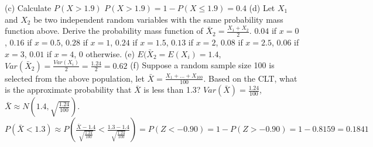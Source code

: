 \documentclass[9pt]{article}
\newcommand*\mean[1]{\bar{#1}}
\begin{document}
\begin{multicols*}{2}
    (c) Calculate $P(X>1.9)$
    $P(X>1.9) = 1-P(X\leq 1.9) = 0.4$\newline
    (d) Let $X_1$ and $X_2$ be two independent random variables with the same probability mass function above. Derive the probability mass function of $\mean{X}_2=\frac{X_1+X_2}{2}$.
    $0.04$ if $x=0$, $0.16$ if $x=0.5$, $0.28$ if $x=1$, $0.24$ if $x=1.5$, $0.13$ if $x=2$, $0.08$ if $x=2.5$, $0.06$ if $x=3$, $0.01$ if $x=4$, 0 otherwise.\newline
    (e) $E(\mean{X}_2=E(X_i)=1.4$, $Var(\mean{X}_2)=\frac{Var(X_i)}{2}=\frac{1.24}{2}=0.62$\newline
    (f) Suppose a random sample size 100 is selected from the above population, let $\mean{X}=\frac{X_1+...+X_100}{100}$.
    Based on the CLT, what is the approximate probability that $\mean{X}$ is less than 1.3?
    $Var(\mean{X})=\frac{1.24}{100}$, $\mean{X}\approx N(1.4,\sqrt{\frac{1.24}{100}})$. $P(\mean{X} < 1.3) \approx P(\frac{\mean{X}-1.4}{\sqrt{\frac{1.24}{100}}} < \frac{1.3-1.4}{\sqrt{\frac{1.24}{100}}}) = P(Z<-0.90) = 1-P(Z>-0.90) = 1-0.8159=0.1841$
\end{multicols*}
\end{document}
